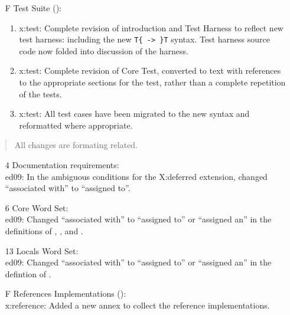 \begin{itemize}
	\item[F] Test Suite ():
		\begin{enumerate}
		\item \textsf{x:test}: Complete revision of introduction and
			Test Harness to reflect new test harness: including
			the new \verb"T{ -> }T" syntax.  Test harness source
			code now folded into discussion of the harness.

		\item \textsf{x:test}: Complete revision of Core Test,
			converted to text with references to the appropriate
			sections for the test, rather than a complete repetition
			of the tests.

		\item \textsf{x:test}: All test cases have been migrated to the
			new syntax and reformatted where appropriate.
		\end{enumerate}
	\end{itemize}


	\begin{quote}
		All changes are formating related.
	\end{quote}


	\begin{itemize}
	\item[4] Documentation requirements: \\
		\textsf{ed09}: In the ambiguous conditions for the
			\textsf{X:deferred} extension, changed ``associated with''
			to \linebreak ``assigned to''.

	\item[6] Core Word Set: \\
		\textsf{ed09}:
			Changed ``associated with'' to ``assigned to''
			or ``assigned an'' in the definitions of
			, ,
			 and .

	\item[13] Locals Word Set: \\
		\textsf{ed09}:
			Changed ``associated with'' to ``assigned to''
			or ``assigned an'' in the defintion of
			.

	\item[F] References Implementations (): \\
		\textsf{x:reference}:
			Added a new annex to collect the reference implementations.
	\end{itemize}

